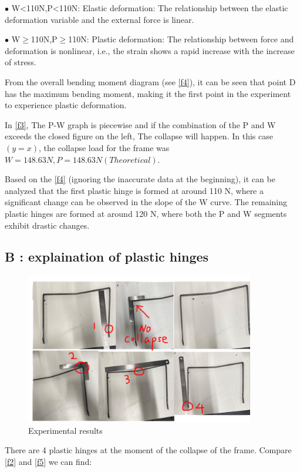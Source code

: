 $\bullet$ W<110N,P<110N: Elastic deformation: The relationship between the elastic deformation variable and the external force is linear.

$\bullet$ W$\geq$110N,P$\geq$110N: Plastic deformation: The relationship between force and deformation is nonlinear, i.e., the strain shows a rapid increase with the increase of stress.

From the overall bending moment diagram (see \autoref{f4}), it can be seen that point D has the maximum bending moment, making it the first point in the experiment to experience plastic deformation.

In \autoref{f3}, The P-W graph is piecewise and if the combination of the P and W exceeds the closed figure on the left, The collapse will happen. In this case$(y=x)$, the collapse load for the frame was $W=148.63N,P=148.63N(Theoretical)$.

Based on the \autoref{f4} (ignoring the inaccurate data at the beginning), it can be analyzed that the first plastic hinge is formed at around 110 N, where a significant change can be observed in the slope of the W curve. The remaining plastic hinges are formed at around 120 N, where both the P and W segments exhibit drastic changes.



\subsection*{B : explaination of plastic hinges}

\begin{figure}[htbp]
    \centering
    \includegraphics[width=10cm]{./fig/18.jpg}
    \caption{Experimental results}
    \label{f5}
\end{figure}

There are 4 plastic hinges at the moment of the collapse of the frame. Compare \autoref{f2} and \autoref{f5} we can find: 

